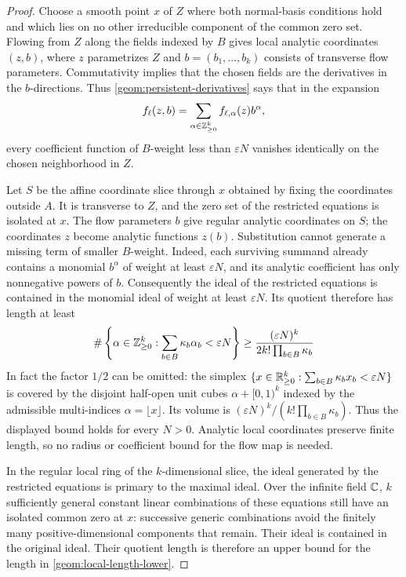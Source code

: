 \begin{proof}
Choose a smooth point $x$ of $Z$ where both normal-basis conditions hold and
which lies on no other irreducible component of the common zero set. Flowing
from $Z$ along the fields indexed by $B$ gives local analytic coordinates
$(z,b)$, where $z$ parametrizes $Z$ and $b=(b_1,\ldots,b_k)$ consists of
transverse flow parameters. Commutativity implies that the chosen fields
are the derivatives in the $b$-directions. Thus
\eqref{geom:persistent-derivatives} says that in the expansion
\[
 f_\ell(z,b)=\sum_{\alpha\in\mathbb Z_{\ge0}^k} f_{\ell,\alpha}(z)b^\alpha,
\]
every coefficient function of $B$-weight less than $\varepsilon N$ vanishes
identically on the chosen neighborhood in $Z$.

Let $S$ be the affine coordinate slice through $x$ obtained by fixing the
coordinates outside $A$. It is transverse to $Z$, and the zero set of the
restricted equations is isolated at $x$. The flow parameters $b$ give
regular analytic coordinates on $S$; the coordinates $z$ become analytic
functions $z(b)$. Substitution cannot generate a missing term of smaller
$B$-weight. Indeed, each surviving summand already contains a monomial
$b^\alpha$ of weight at least $\varepsilon N$, and its analytic coefficient
has only nonnegative powers of $b$. Consequently the ideal of the
restricted equations is contained in the monomial ideal of weight at least
$\varepsilon N$. Its quotient therefore has length at least
\begin{equation}
\label{geom:local-length-lower}
 \#\left\{\alpha\in\mathbb Z_{\ge0}^k:
       \sum_{b\in B}\kappa_b\alpha_b<\varepsilon N\right\}
 \ge \frac{(\varepsilon N)^k}{2k!\prod_{b\in B}\kappa_b}
\end{equation}
In fact the factor $1/2$ can be omitted: the simplex
$\{x\in\mathbb R_{\ge0}^k:\sum_{b\in B}\kappa_bx_b<\varepsilon N\}$
is covered by the disjoint half-open unit cubes $\alpha+[0,1)^k$
indexed by the admissible multi-indices $\alpha=\lfloor x\rfloor$. Its volume is
$(\varepsilon N)^k/(k!\prod_{b\in B}\kappa_b)$. Thus the displayed
bound holds for every $N>0$. Analytic local coordinates preserve finite
length, so no radius or coefficient bound for the flow map is needed.

In the regular local ring of the $k$-dimensional slice, the ideal generated
by the restricted equations is primary to the maximal ideal. Over the
infinite field $\mathbb C$, $k$ sufficiently general constant linear
combinations of these equations still have an isolated common zero at
$x$: successive generic combinations avoid the finitely many
positive-dimensional components that remain. Their ideal is contained
in the original ideal. Their quotient length is therefore an upper bound
for the length in \eqref{geom:local-length-lower}.


\end{proof}
